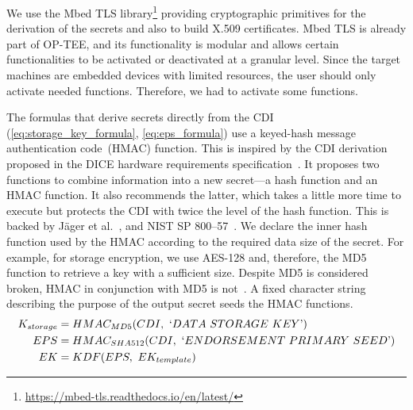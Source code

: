 We use the Mbed TLS library\footnote{\url{https://mbed-tls.readthedocs.io/en/latest/}} providing cryptographic primitives for the derivation of the secrets and also to build X.509 certificates.
Mbed TLS is already part of OP-TEE, and its functionality is modular and allows certain functionalities to be activated or deactivated at a granular level.
Since the target machines are embedded devices with limited resources, the user should only activate needed functions.
Therefore, we had to activate some functions.

The formulas that derive secrets directly from the CDI (\autoref{eq:storage_key_formula}, \autoref{eq:eps_formula}) use a keyed-hash message authentication code~(HMAC) function.
This is inspired by the CDI derivation proposed in the DICE hardware requirements specification~\cite{dice-hardware-reqs}.
It proposes two functions to combine information into a new secret---a hash function and an HMAC function.
It also recommends the latter, which takes a little more time to execute but protects the CDI with twice the level of the hash function.
This is backed by Jäger et al.~\cite{Jaeger2017}, and NIST SP 800--57~\cite{Barker2020}.
We declare the inner hash function used by the HMAC according to the required data size of the secret.
For example, for storage encryption, we use AES-128 and, therefore, the MD5 function to retrieve a key with a sufficient size.
Despite MD5 is considered broken, HMAC in conjunction with MD5 is not~\cite{Bellare2006}.
A fixed character string describing the purpose of the output secret seeds the HMAC functions. 
\begin{align}
  \label{eq:storage_key_formula}
  K_{storage} &= HMAC_{MD5}(CDI,\ `DATA\ STORAGE\ KEY\text{'})\\
  \label{eq:eps_formula}
  EPS &= HMAC_{SHA512}(CDI,\ `ENDORSEMENT\ PRIMARY\ SEED\text{'})\\
  \label{eq:ek_formula}
  EK  &= KDF(EPS,\ EK_{template})
\end{align}



